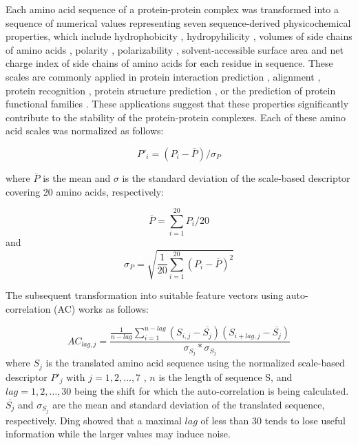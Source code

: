 \documentclass[3p,times,twocolumn]{elsarticle}
\begin{document}
Each amino acid sequence of a protein-protein complex was transformed
into a sequence of numerical values representing seven
sequence-derived physicochemical properties, which include
hydrophobicity \cite{Eisenberg:1984, Koehler:2009}, hydropyhilicity
\cite{Hopp:1981}, volumes of side chains of amino acids
\cite{Krigbaum:1979}, polarity \cite{Grantham:1974}, polarizability
\cite{Charton:1982}, solvent-accessible surface area \cite{Rose:1985}
and net charge index of side chains of amino acids \cite{Zhou:2006}
for each residue in sequence. These scales are commonly applied in
protein interaction prediction \cite{Bock:2001} \cite{Bock:2003},
alignment \cite{Stamm:2013}, protein recognition \cite{Ding:2001},
protein structure prediction \cite{Durham:2009}, or the prediction of
protein functional families \cite{Cai:2003}. These applications
suggest that these properties significantly contribute to the
stability of the protein-protein complexes. Each of these amino acid
scales was normalized as follows: 

\begin{equation}
P'_{i} = (P_i - \overline{P}) / \sigma_P
\end{equation}

where $\overline{P}$ is the mean and $\sigma$ is the standard
deviation of the scale-based descriptor covering 20 amino acids,
respectively: 

\begin{equation}
\overline{P} = \sum^{20}_{i=1}P_i / 20
\end{equation}
 and 
\begin{equation}
\sigma_P = \sqrt{\frac{1}{20} \sum^{20}_{i=1}(P_i - \overline{P})^2}
\end{equation}

The subsequent transformation into suitable feature vectors using
auto-correlation (AC) works as follows: 

\begin{equation}
AC_{lag, j} = \frac {\frac{1}{n-lag} \sum^{n-lag}_{i=1} ( S_{i,j} - \overline{S_j}) (S_{i+lag,j} - \overline{S_j})} { \sigma_{S_j} * \sigma_{S_j} }
\end{equation}
where $S_j$ is the translated amino acid sequence using the normalized
scale-based descriptor $P'_j$ with $j = 1, 2, \dots, 7$ , $n$ is the
length of sequence S, and $lag = 1, 2, \dots, 30$  being the shift for
which the auto-correlation is being calculated. $\overline{S_j}$ and
$\sigma_{S_j}$ are the mean and standard deviation of the translated
sequence, respectively. Ding \cite{Ding:2016} showed that a maximal
$lag$ of less than 30 tends to lose useful information while the
larger values may induce noise. 
\end{document}
